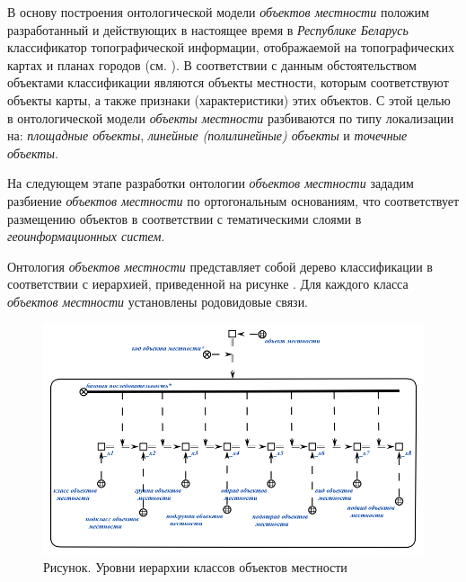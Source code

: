 \begin{SCn}
\begin{scnindent}
	\begin{scneqtoset}
	\end{scneqtoset}
\end{scnindent}
\end{SCn}

В основу построения онтологической модели \textit{объектов местности} положим разработанный и действующих в настоящее время в \textit{Республике Беларусь} классификатор топографической  информации, отображаемой на топографических картах и планах городов (см. ).
В соответствии с данным обстоятельством объектами классификации являются объекты местности, которым соответствуют объекты карты, а также признаки (характеристики) этих объектов.  
С этой целью в онтологической модели \textit{объекты местности} разбиваются по типу локализации на: \textit{площадные объекты}, \textit{линейные (полилинейные) объекты} и \textit{точечные объекты}.

На следующем этапе разработки онтологии \textit{объектов местности} зададим разбиение \textit{объектов местности} по ортогональным основаниям, что соответствует размещению объектов в соответствии с тематическими слоями в \textit{геоинформационных систем}.  

Онтология \textit{объектов местности} представляет собой дерево классификации в соответствии с иерархией, приведенной на рисунке . Для каждого класса \textit{объектов местности} установлены родовидовые связи. 

\begin{figure}[H]
\center
\includegraphics[scale=0.8]{author/part7/figures/geo_code.png}
\caption{Рисунок. Уровни иерархии классов объектов местности} 
\label{fig:pic1}
\end{figure}

